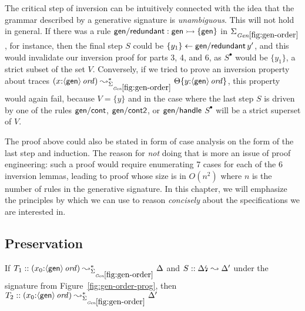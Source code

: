 The critical step of inversion can be intuitively connected with the
idea that the grammar described by a generative signature is {\it
  unambiguous}. This will not hold in general. If there was
a rule ${\sf gen/redundant} : {\sf gen} \rightarrowtail \{ {\sf gen} \}$ in
$\Sigma_{\it Gen\ref{fig:gen-order}}$, for instance, then the final
step $S$ could be
$\{{y_1}\} \leftarrow {{\sf gen/redundant}\,y'}$, and this would invalidate our
inversion proof
for parts 3, 4, and 6, as $S^{\bullet}$ would be $\{y_1\}$, a strict
subset of the set $V$. 
Conversely, if we tried to prove an inversion
property about traces $(x{:}\istrue{\susp{\sf gen}})
\leadsto^*_{\siggenorder} \tackon{\Theta}{y{:}\istrue{\susp{{\sf
        gen}}}}$, this property would again fail, because $V = \{ y
\}$ and in the case where the last step $S$ is driven by one of the
rules ${\sf gen/cont}$, ${\sf gen/cont2}$, or ${\sf gen/handle}$
$S^{\bullet}$ will be a strict superset of $V$.

The proof above could also be stated in form of case analysis on the
form of the last step and induction. The reason for {\it not} doing
that is more an issue of proof engineering: such a proof would require
enumerating 7 cases for each of the 6 inversion lemmas, leading to
proof whose size is in $O(n^2)$ where $n$ is the number of rules
in the generative signature. In this chapter, we will emphasize the principles
by which we can use to reason {\it concisely} about the specifications
we are interested in.

\subsection{Preservation}

\begin{theorem}\label{thm:siggenorder}
If $T_1 :: (x_0{:}\istrue{\susp{\sf gen}}) \leadsto^*_{\siggenorder} 
   \Delta$ and $S :: {\Delta}{\mbox{\lightning}}_{} \leadsto \Delta'$
under the signature from Figure~\ref{fig:gen-order-prog}, then
$T_2 :: (x_0{:}\istrue{\susp{\sf gen}}) \leadsto^*_{\siggenorder} 
   \Delta'$
\end{theorem}

